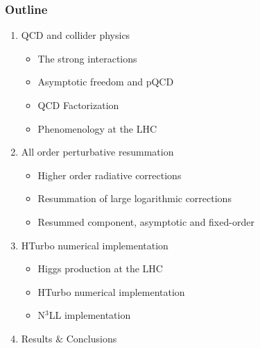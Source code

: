 \documentclass[aspectratio=43]{beamer}
\begin{document}
\begin{frame}

	\frametitle{Outline}
	
	\begin{enumerate}
		\item {\color{blue}QCD and collider physics}
		\begin{itemize}
			\item The strong interactions
			\item Asymptotic freedom and pQCD
			\item QCD Factorization
			\item Phenomenology at the LHC
		\end{itemize}
		\item {\color{blue}All order perturbative resummation}
		\begin{itemize}
			\item Higher order radiative corrections
			\item Resummation of large logarithmic corrections
			\item Resummed component, asymptotic and fixed-order
		\end{itemize}
		\item {\color{blue}HTurbo numerical implementation}
		\begin{itemize}
			\item Higgs production at the LHC
			\item HTurbo numerical implementation
			\item N$^{3}$LL implementation
		\end{itemize}
		\item Results $\&$ Conclusions
	\end{enumerate}
	
\end{frame}

%
%

\begin{frame}


\end{frame}
\end{document}
